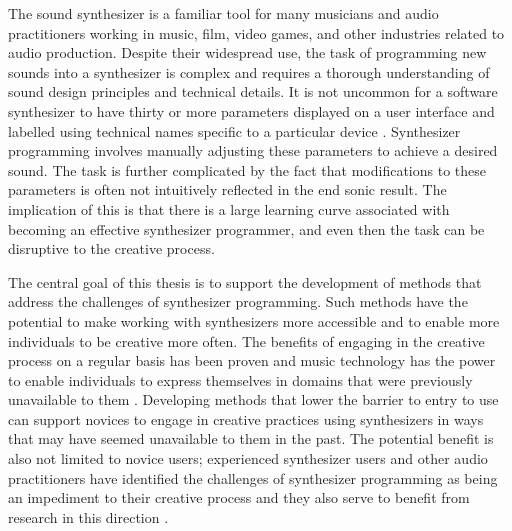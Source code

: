 \label{chapter:introduction}
The sound synthesizer is a familiar tool for many musicians and audio practitioners working in music, film, video games, and other industries related to audio production. Despite their widespread use, the task of programming new sounds into a synthesizer is complex and requires a thorough understanding of sound design principles and technical details. It is not uncommon for a software synthesizer to have thirty or more parameters displayed on a user interface and labelled using technical names specific to a particular device \cite{rasmussen2018evaluating}. Synthesizer programming involves manually adjusting these parameters to achieve a desired sound. The task is further complicated by the fact that modifications to these parameters is often not intuitively reflected in the end sonic result.
The implication of this is that there is a large learning curve associated with becoming an effective synthesizer programmer, and even then the task can be disruptive to the creative process. 

The central goal of this thesis is to support the development of methods that address the challenges of synthesizer programming. Such methods have the potential to make working with synthesizers more accessible and to enable more individuals to be creative more often. The benefits of engaging in the creative process on a regular basis has been proven \cite{conner2018everyday} and music technology has the power to enable individuals to express themselves in domains that were previously unavailable to them \cite{tavana2015democracy}. Developing methods that lower the barrier to entry to use can support novices to engage in creative practices using synthesizers in ways that may have seemed unavailable to them in the past. The potential benefit is also not limited to novice users; experienced synthesizer users and other audio practitioners have identified the challenges of synthesizer programming as being an impediment to their creative process and they also serve to benefit from research in this direction \cite{krekovic2014intelligent}.

